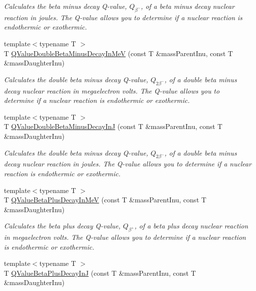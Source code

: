 \begin{DoxyCompactItemize}
\begin{DoxyCompactList}\small\item\em Calculates the beta minus decay Q-\/value, $Q_{\beta^-}$, of a beta minus decay nuclear reaction in joules. The Q-\/value allows you to determine if a nuclear reaction is endothermic or exothermic. \end{DoxyCompactList}\item 
{\footnotesize template$<$typename T $>$ }\\T \hyperlink{group___q_value_ga0eefdd84aa89d210e00dca043368dfeb}{Q\+Value\+Double\+Beta\+Minus\+Decay\+In\+MeV} (const T \&mass\+Parent\+Inu, const T \&mass\+Daughter\+Inu)
\begin{DoxyCompactList}\small\item\em Calculates the double beta minus decay Q-\/value, $Q_{2\beta^-}$, of a double beta minus decay nuclear reaction in megaelectron volts. The Q-\/value allows you to determine if a nuclear reaction is endothermic or exothermic. \end{DoxyCompactList}\item 
{\footnotesize template$<$typename T $>$ }\\T \hyperlink{group___q_value_gaf19d189152aec04d8b1ebbbe8792540b}{Q\+Value\+Double\+Beta\+Minus\+Decay\+InJ} (const T \&mass\+Parent\+Inu, const T \&mass\+Daughter\+Inu)
\begin{DoxyCompactList}\small\item\em Calculates the double beta minus decay Q-\/value, $Q_{2\beta^-}$, of a double beta minus decay nuclear reaction in joules. The Q-\/value allows you to determine if a nuclear reaction is endothermic or exothermic. \end{DoxyCompactList}\item 
{\footnotesize template$<$typename T $>$ }\\T \hyperlink{group___q_value_ga9bf549cd4f8e1c76e9cc41b72d4f0279}{Q\+Value\+Beta\+Plus\+Decay\+In\+MeV} (const T \&mass\+Parent\+Inu, const T \&mass\+Daughter\+Inu)
\begin{DoxyCompactList}\small\item\em Calculates the beta plus decay Q-\/value, $Q_{\beta^+}$, of a beta plus decay nuclear reaction in megaelectron volts. The Q-\/value allows you to determine if a nuclear reaction is endothermic or exothermic. \end{DoxyCompactList}\item 
{\footnotesize template$<$typename T $>$ }\\T \hyperlink{group___q_value_ga066fe9a9816a204c801c557a85bc60df}{Q\+Value\+Beta\+Plus\+Decay\+InJ} (const T \&mass\+Parent\+Inu, const T \&mass\+Daughter\+Inu)

\end{DoxyCompactItemize}

